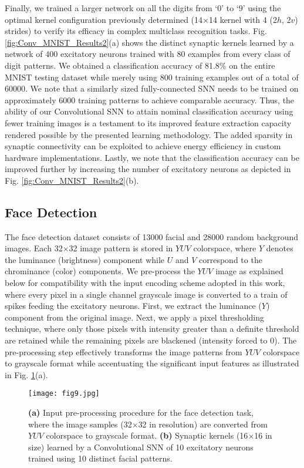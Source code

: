 \documentclass[journal, onecolumn]{IEEEtran}
\begin{document}
Finally, we trained a larger network on all the digits from `$0$' to `$9$' using the optimal kernel configuration previously determined (14$\times$14 kernel with 4 (2$h$, 2$v$) strides) to verify its efficacy in complex multiclass recognition tasks. Fig. \ref{fig:Conv_MNIST_Results2}(a) shows the distinct synaptic kernels learned by a network of 400 excitatory neurons trained with 80 examples from every class of digit patterns. We obtained a classification accuracy of 81.8\% on the entire MNIST testing dataset while merely using 800 training examples out of a total of 60000. We note that a similarly sized fully-connected SNN needs to be trained on approximately 6000 training patterns to achieve comparable accuracy. Thus, the ability of our Convolutional SNN to attain nominal classification accuracy using fewer training images is a testament to its improved feature extraction capacity rendered possible by the presented learning methodology. The added sparsity in synaptic connectivity can be exploited to achieve energy efficiency in custom hardware implementations. Lastly, we note that the classification accuracy can be improved further by increasing the number of excitatory neurons as depicted in Fig. \ref{fig:Conv_MNIST_Results2}(b).

\subsection*{\normalsize\bf{Face Detection}}
The face detection dataset \cite{YUV_FACE} consists of 13000 facial and 28000 random background images. Each 32$\times$32 image pattern is stored in $YUV$ colorspace, where $Y$ denotes the luminance (brightness) component while $U$ and $V$ correspond to the chrominance (color) components. We pre-process the $YUV$ image as explained below for compatibility with the input encoding scheme adopted in this work, where every pixel in a single channel grayscale image is converted to a train of spikes feeding the excitatory neurons. First, we extract the luminance ($Y$) component from the original image. Next, we apply a pixel thresholding technique, where only those pixels with intensity greater than a definite threshold are retained while the remaining pixels are blackened (intensity forced to 0). The pre-processing step effectively transforms the image patterns from $YUV$ colorspace to grayscale format while accentuating the significant input features as illustrated in Fig. \ref{fig:Conv_FaceYUV_Results}(a).

\begin{figure}[!t]
\centering
\texttt{[image: fig9.jpg]}
\caption{\textbf{(a)} Input pre-processing procedure for the face detection task, where the image samples (32$\times$32 in resolution) are converted from $YUV$ colorspace to grayscale format. \textbf{(b)} Synaptic kernels (16$\times$16 in size) learned by a Convolutional SNN of 10 excitatory neurons trained using 10 distinct facial patterns.}
\label{fig:Conv_FaceYUV_Results}
\end{figure}
\end{document}
